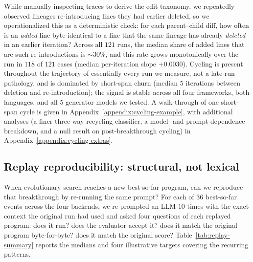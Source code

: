 While manually inspecting traces to derive the edit taxonomy, we repeatedly observed lineages re-introducing lines they had earlier deleted, so we operationalized this as a deterministic check: for each parent--child diff, how often is an \emph{added} line byte-identical to a line that the same lineage has already \emph{deleted} in an earlier iteration? Across all $121$ runs, the median share of added lines that are such re-introductions is $\sim\!30\%$, and this rate grows monotonically over the run in $118$ of $121$ cases (median per-iteration slope $+0.0030$). Cycling is present throughout the trajectory of essentially every run we measure, not a late-run pathology, and is dominated by short-span churn (median $5$ iterations between deletion and re-introduction); the signal is stable across all four frameworks, both languages, and all $5$ generator models we tested. A walk-through of one short-span cycle is given in Appendix~\ref{appendix:cycling-example}, with additional analyses (a finer three-way recycling classifier, a model- and prompt-dependence breakdown, and a null result on post-breakthrough cycling) in Appendix~\ref{appendix:cycling-extras}.


\subsection{Replay reproducibility: structural, not lexical}
\label{sec:replay}

When evolutionary search reaches a new best-so-far program, can we reproduce that breakthrough by re-running the same prompt? For each of $36$ best-so-far events across the four backends, we re-prompted an LLM $10$ times with the exact context the original run had used and asked four questions of each replayed program: does it run? does the evaluator accept it? does it match the original program byte-for-byte? does it match the original score? Table~\ref{tab:replay-summary} reports the medians and four illustrative targets covering the recurring patterns.


